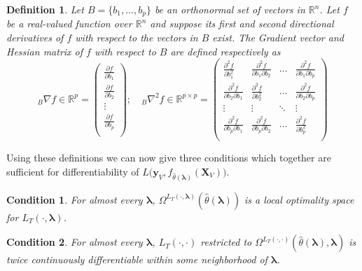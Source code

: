 \documentclass[10pt,letterpaper]{article}
\newtheorem{definition}{Definition}
\newtheorem{condition}{Condition}
\begin{document}
\begin{definition}
Let $B = \{ b_1, ..., b_p \}$ be an orthonormal set of vectors in $\mathbb{R}^n$. Let $f$ be a real-valued function over $\mathbb{R}^n$ and suppose its first and second directional derivatives of $f$ with respect to the vectors in $B$ exist. The Gradient vector and Hessian matrix of $f$ with respect to $B$ are defined respectively as
\begin{equation}\label{eq:hess}
_B\nabla f \in \mathbb{R}^{p} =
\left (
\begin{array}{c}
\frac{\partial f}{\partial b_1} \\
\frac{\partial f}{\partial b_2} \\
\vdots\\
\frac{\partial f}{\partial b_p}\\
\end{array}
\right );
\quad
_B\nabla^2 f \in \mathbb{R}^{p\times p} =
\left (
\begin{array}{cccc}
\frac{\partial^2 f}{\partial b_1^2} & \frac{\partial^2 f}{\partial b_1 \partial b_2} & ...  & \frac{\partial^2 f}{\partial b_1 \partial b_p} \\
\frac{\partial^2 f}{\partial b_2 \partial b_1} & \frac{\partial^2 f}{\partial b_2^2} & ...  & \frac{\partial^2 f}{\partial b_2 \partial b_p} \\
\vdots & \vdots &  \ddots & \vdots \\
\frac{\partial^2 f}{\partial b_p \partial b_1} & \frac{\partial^2 f}{\partial b_p \partial b_2} & ...  & \frac{\partial^2 f}{\partial b_p^2} \\
\end{array}
\right )
\end{equation}
\end{definition}

Using these definitions we can now give three conditions which together are sufficient for differentiability of $L \Big( \boldsymbol{y}_V, f_{\hat{\theta}(\boldsymbol{\lambda})}(\boldsymbol{X}_V) \Big )$.

\begin{condition}
For almost every $\boldsymbol{\lambda}$, $\Omega^{L_T(\cdot, \boldsymbol{\lambda})}(\hat{\theta}\left(\boldsymbol{\lambda}\right))$ is a local optimality space for $L_T\left(\cdot,\boldsymbol{\lambda}\right)$.
\end{condition}

\begin{condition}
For almost every $\boldsymbol{\lambda}$, $L_T\left(\cdot, \cdot\right)$ restricted to $\Omega^{L_T(\cdot, \cdot)}(\hat{\theta}\left(\boldsymbol{\lambda}\right), \boldsymbol{\lambda})$ is twice continuously differentiable within some neighborhood of $\boldsymbol{\lambda}$.
\end{condition}
\end{document}

